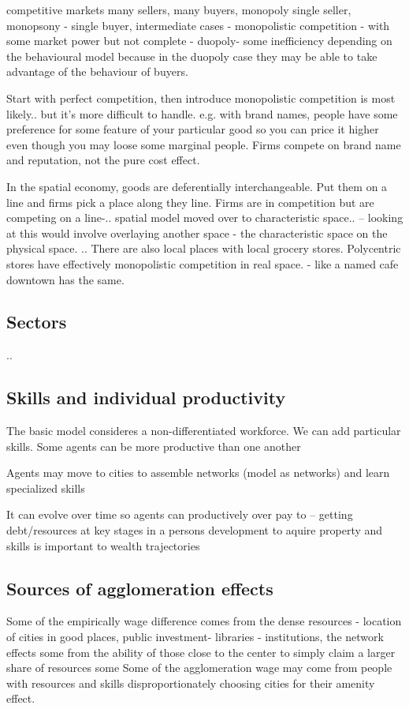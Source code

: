 competitive markets many sellers, many buyers, monopoly single seller, monopsony - single buyer, intermediate cases - monopolistic competition - with some market power but not complete - duopoly- some inefficiency depending on the behavioural model because in the duopoly case they may be able to take advantage of the behaviour of buyers.

Start with perfect competition, then introduce monopolistic competition is most likely.. but it's more difficult to handle. e.g. with brand names, people have some preference for some feature of your particular good so you can price it higher even though you may loose some marginal people. Firms compete on brand name and reputation, not the pure cost effect.

In the spatial economy, goods are deferentially interchangeable. Put them on a line and firms pick a place along they line. Firms are in competition but are competing on a line-.. spatial model moved over to characteristic space.. -- looking at this would involve overlaying another space - the characteristic space on the physical space. .. There are also local places with local grocery stores. Polycentric stores have effectively monopolistic competition in real space. - like a named cafe downtown has the same.

\subsection{Sectors}
..

\subsection{Skills and individual productivity}
The basic model consideres a non-differentiated workforce. We can add particular skills.
Some agents can be more productive than one another

Agents may move to cities to assemble networks (model as networks)
and learn specialized skills

It can evolve over time so agents can productively over pay to  
-- getting debt/resources at key stages in a persons development to aquire property and skills is important to \gls{wealth trajectories}


\subsection{Sources of agglomeration effects}
Some of the empirically wage difference comes from the dense resources  - location of cities in good places, public investment- libraries - institutions, the network effects
some from the ability of those close to the center to simply claim a larger share of resources
some 
Some of the agglomeration wage may come from people with resources and skills disproportionately choosing cities for their amenity effect. 

